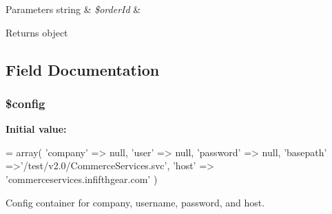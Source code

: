 \begin{DoxyParams}[1]{Parameters}
string & {\em \$order\-Id} & \\
\hline
\end{DoxyParams}
\begin{DoxyReturn}{Returns}
object 
\end{DoxyReturn}


\subsection{Field Documentation}
\hypertarget{class_fifth_gear_a49c7011be9c979d9174c52a8b83e5d8e}{
\subsubsection[{\$config}]{\setlength{\rightskip}{0pt plus 5cm}\$config}}\label{class_fifth_gear_a49c7011be9c979d9174c52a8b83e5d8e}
{\bfseries Initial value\-:}
\begin{DoxyCode}
= array(
                             \textcolor{stringliteral}{'company'}  => null,    
                             \textcolor{stringliteral}{'user'}     => null,
                             \textcolor{stringliteral}{'password'} => null,
                             \textcolor{stringliteral}{'basepath'} =>\textcolor{stringliteral}{'/test/v2.0/CommerceServices.svc'},
                             \textcolor{stringliteral}{'host'}     => \textcolor{stringliteral}{'commerceservices.infifthgear.com'}
                         )
\end{DoxyCode}


Config container for company, username, password, and host. 

